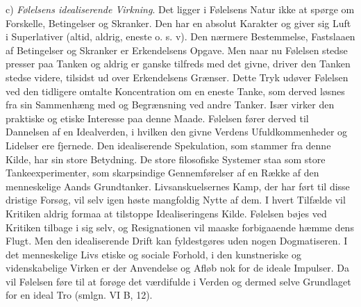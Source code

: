 \documentclass[12pt,a4paper,openany]{book}
\newcommand{\opage}[1]{\marginnote{\footnotesize\textit{[#1]}}}
\begin{document}
\opage{360}c) \emph{Følelsens idealiserende Virkning}. Det ligger i
Følelsens Natur ikke at spørge om Forskelle, Betingelser og Skranker.
Den har en absolut Karakter og giver sig Luft i Superlativer (altid,
aldrig, eneste o. s. v). Den nærmere Bestemmelse, Fastslaaen af
Betingelser og Skranker er Erkendelsens Opgave. Men naar nu Følelsen
stedse presser paa Tanken og aldrig er ganske tilfreds med det givne,
driver den Tanken stedse videre, tilsidst ud over Erkendelsens Grænser.
Dette Tryk udøver Følelsen ved den tidligere omtalte Koncentration om en
eneste Tanke, som derved løsnes fra sin Sammenhæng med og Begrænsning
ved andre Tanker. Især virker den praktiske og etiske Interesse paa
denne Maade. Følelsen fører derved til Dannelsen af en Idealverden, i
hvilken den givne Verdens Ufuldkommenheder og Lidelser ere fjernede. Den
idealiserende Spekulation, som stammer fra denne Kilde, har sin store
Betydning. De store filosofiske Systemer staa som store
Tankeexperimenter, som skarpsindige Gennemførelser af en Række af den
menneskelige Aands Grundtanker. Livsanskuelsernes Kamp, der har ført til
disse dristige Forsøg, vil selv igen høste mangfoldig Nytte af dem. I
hvert Tilfælde vil Kritiken aldrig formaa at tilstoppe Idealiseringens
Kilde. Følelsen bøjes ved Kritiken tilbage i sig selv, og Resignationen
vil maaske forbigaaende hæmme dens Flugt. Men den idealiserende Drift
kan fyldestgøres uden nogen Dogmatiseren. I det menneskelige Livs etiske
og sociale Forhold, i den kunstneriske og videnskabelige Virken er der
Anvendelse og Afløb nok for de ideale Impulser. Da vil Følelsen føre til
at forøge det værdifulde i Verden og dermed selve Grundlaget for en
ideal Tro (smlgn. VI B, 12).
\end{document}
